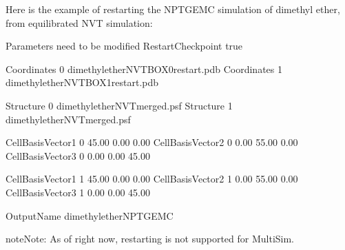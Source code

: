 \documentclass[letterpaper,10pt,english]{sphinxmanual}
\begin{document}
Here is the example of restarting the NPT\sphinxhyphen{}GEMC simulation of dimethyl ether, from equilibrated NVT simulation:

\begin{sphinxVerbatim}[commandchars=\\\{\}]
\PYGZsh{}\PYGZsh{}\PYGZsh{}\PYGZsh{}\PYGZsh{}\PYGZsh{}\PYGZsh{}\PYGZsh{}\PYGZsh{}\PYGZsh{}\PYGZsh{}\PYGZsh{}\PYGZsh{}\PYGZsh{}\PYGZsh{}\PYGZsh{}\PYGZsh{}\PYGZsh{}\PYGZsh{}\PYGZsh{}\PYGZsh{}\PYGZsh{}\PYGZsh{}\PYGZsh{}\PYGZsh{}\PYGZsh{}\PYGZsh{}\PYGZsh{}\PYGZsh{}\PYGZsh{}\PYGZsh{}\PYGZsh{}\PYGZsh{}\PYGZsh{}\PYGZsh{}\PYGZsh{}\PYGZsh{}\PYGZsh{}\PYGZsh{}\PYGZsh{}\PYGZsh{}\PYGZsh{}\PYGZsh{}\PYGZsh{}\PYGZsh{}\PYGZsh{}\PYGZsh{}\PYGZsh{}\PYGZsh{}\PYGZsh{}\PYGZsh{}\PYGZsh{}\PYGZsh{}\PYGZsh{}\PYGZsh{}\PYGZsh{}
\PYGZsh{} Parameters need to be modified
\PYGZsh{}\PYGZsh{}\PYGZsh{}\PYGZsh{}\PYGZsh{}\PYGZsh{}\PYGZsh{}\PYGZsh{}\PYGZsh{}\PYGZsh{}\PYGZsh{}\PYGZsh{}\PYGZsh{}\PYGZsh{}\PYGZsh{}\PYGZsh{}\PYGZsh{}\PYGZsh{}\PYGZsh{}\PYGZsh{}\PYGZsh{}\PYGZsh{}\PYGZsh{}\PYGZsh{}\PYGZsh{}\PYGZsh{}\PYGZsh{}\PYGZsh{}\PYGZsh{}\PYGZsh{}\PYGZsh{}\PYGZsh{}\PYGZsh{}\PYGZsh{}\PYGZsh{}\PYGZsh{}\PYGZsh{}\PYGZsh{}\PYGZsh{}\PYGZsh{}\PYGZsh{}\PYGZsh{}\PYGZsh{}\PYGZsh{}\PYGZsh{}\PYGZsh{}\PYGZsh{}\PYGZsh{}\PYGZsh{}\PYGZsh{}\PYGZsh{}\PYGZsh{}\PYGZsh{}\PYGZsh{}\PYGZsh{}\PYGZsh{}
RestartCheckpoint   true

Coordinates     0   dimethylether\PYGZus{}NVT\PYGZus{}BOX\PYGZus{}0\PYGZus{}restart.pdb
Coordinates     1   dimethylether\PYGZus{}NVT\PYGZus{}BOX\PYGZus{}1\PYGZus{}restart.pdb

Structure       0   dimethylether\PYGZus{}NVT\PYGZus{}merged.psf
Structure       1   dimethylether\PYGZus{}NVT\PYGZus{}merged.psf

\PYGZsh{}CellBasisVector1   0       45.00   0.00    0.00
\PYGZsh{}CellBasisVector2   0       0.00    55.00   0.00
\PYGZsh{}CellBasisVector3   0       0.00    0.00    45.00

\PYGZsh{}CellBasisVector1   1       45.00   0.00    0.00
\PYGZsh{}CellBasisVector2   1       0.00    55.00   0.00
\PYGZsh{}CellBasisVector3   1       0.00    0.00    45.00

OutputName          dimethylether\PYGZus{}NPT\PYGZus{}GEMC
\end{sphinxVerbatim}

\begin{sphinxadmonition}{note}{Note:}
As of right now, restarting is not supported for Multi\sphinxhyphen{}Sim.
\end{sphinxadmonition}
\end{document}
